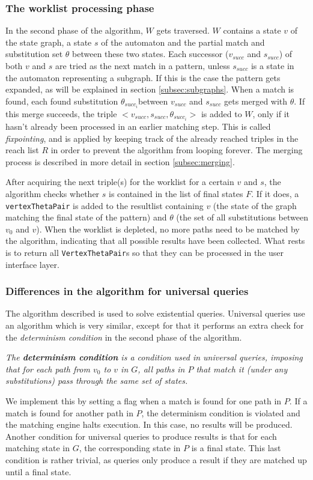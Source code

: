 \subsubsection*{The worklist processing phase}
In the second phase of the algorithm, $W$ gets traversed. $W$ contains a state $v$ of the state graph, a state $s$ of the automaton and the partial match and substitution set $\theta$ between these two states. Each successor ($v_{succ}$ and $s_{succ}$) of both $v$ and $s$ are tried as the next match in a pattern, unless $s_{succ}$ is a state in the automaton representing a subgraph. If this is the case the pattern gets expanded, as will be explained in section \ref{subsec:subgraphs}. When a match is found, each found substitution $\theta_{succ_i}$between $v_{succ}$ and $s_{succ}$ gets merged with $\theta$. If this merge succeeds, the triple $<v_{succ}, s_{succ}, \theta_{succ_i}>$ is added to $W$, only if it hasn't already been processed in an earlier matching step. This is called \textit{fixpointing}, and is applied by keeping track of the already reached triples in the reach list $R$ in order to prevent the algorithm from looping forever. The merging process is described in more detail in section \ref{subsec:merging}. 

After acquiring the next triple(s) for the worklist for a certain $v$ and $s$, the algorithm checks whether $s$ is contained in the list of final states $F$. If it does, a \texttt{vertexThetaPair} is added to the resultlist containing $v$ (the state of the graph matching the final state of the pattern) and $\theta$ (the set of all substitutions between $v_0$ and $v$). When the worklist is depleted, no more paths need to be matched by the algorithm, indicating that all possible results have been collected. What rests is to return all \texttt{VertexThetaPair}s so that they can be processed in the user interface layer.

\subsubsection*{Differences in the algorithm for universal queries}
 The algorithm described is used to solve existential queries. Universal queries use an algorithm which is very similar, except for that it performs an extra check for the \textit{determinism condition} in the second phase of the algorithm. 
\begin{definition}
\textit{The \textbf{determinism condition} is a condition used in universal queries, imposing that for each path from $v_0$ to $v$ in $G$, all paths in $P$ that match it (under any substitutions) pass through the same set of states.}
\end{definition}
 We implement this by setting a flag when a match is found for one path in $P$. If a match is found for another path in $P$, the determinism condition is violated and the matching engine halts execution. In this case, no results will be produced. Another condition for universal queries to produce results is that for each matching state in $G$, the corresponding state in $P$ is a final state. This last condition is rather trivial, as queries only produce a result if they are matched up until a final state.

